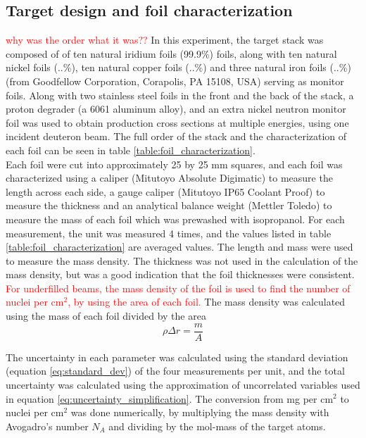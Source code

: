 \documentclass[a4paper,11pt,twoside]{book}
\begin{document}
\subsection{Target design and foil characterization}
\textcolor{red}{why was the order what it was??}
In this experiment, the target stack was composed of of ten natural iridium foils (99.9\%) foils, along with ten natural nickel foils (..\%), ten natural copper foils (..\%) and three natural iron foils (..\%) (from Goodfellow Corporation, Corapolis, PA 15108, USA) serving as monitor foils. Along with two stainless steel foils in the front and the back of the stack, a proton degrader (a 6061 aluminum alloy), and an extra nickel neutron monitor foil was used to obtain production cross sections at multiple energies, using one incident deuteron beam. The full order of the stack and the characterization of each foil can be seen in table \ref{table:foil_characterization}. \\

\noindent 
Each foil were cut into approximately 25 by 25 mm squares, and each foil was characterized using a caliper (Mitutoyo Absolute Digimatic) to measure the length across each side, a gauge caliper (Mitutoyo IP65 Coolant Proof) to measure the thickness and an analytical balance weight (Mettler Toledo) to measure the mass of each foil which was prewashed with isopropanol. For each measurement, the unit was measured 4 times, and the values listed in table \ref{table:foil_characterization} are averaged values. The length and mass were used to measure the mass density. The thickness was not used in the
calculation of the mass density, but was a good indication that the foil thicknesses were consistent.
\textcolor{red}{For underfilled beams, the mass density of the foil is used to find the number of nuclei per cm$^2$, by using the area of each foil.} The mass density was calculated using the mass of each foil divided by the area
\begin{equation}
    \rho \Delta r = \frac{m}{A}
\end{equation}

\noindent 
The uncertainty in each parameter was calculated using the standard deviation (equation \ref{eq:standard_dev}) of the four measurements per unit, and the total uncertainty was calculated using the approximation of uncorrelated variables used in equation \ref{eq:uncertainty_simplification}. The conversion from mg per cm$^2$ to nuclei per cm$^2$ was done numerically, by multiplying the mass density with Avogadro's number $N_A$ and dividing by the mol-mass of the target atoms. \\
\end{document}
